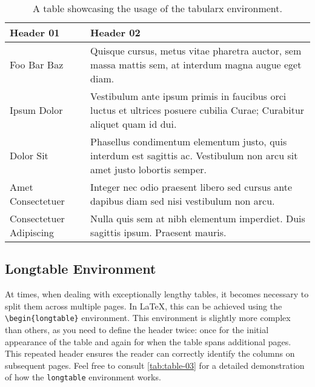 {	\begin{table}[!htpb]
		\caption{A table showcasing the usage of the tabularx environment.}
		\label{tab:table-02}
		\begin{tabularx}{\textwidth}{lX}
			\toprule
			\textbf{Header 01}      & \textbf{Header 02}                                                                                                        \\
			\midrule
			Foo Bar Baz             & Quisque cursus, metus vitae pharetra auctor, sem massa mattis sem, at interdum magna augue eget diam.                     \\
			Ipsum Dolor             & Vestibulum ante ipsum primis in faucibus orci luctus et ultrices posuere cubilia Curae; Curabitur aliquet quam id dui.    \\
			Dolor Sit               & Phasellus condimentum elementum justo, quis interdum est sagittis ac. Vestibulum non arcu sit amet justo lobortis semper. \\
			Amet Consectetuer       & Integer nec odio praesent libero sed cursus ante dapibus diam sed nisi vestibulum non arcu.                               \\
			Consectetuer Adipiscing & Nulla quis sem at nibh elementum imperdiet. Duis sagittis ipsum. Praesent mauris.                                         \\
			\bottomrule
		\end{tabularx}
	\end{table}

	\subsection{Longtable Environment}
	At times, when dealing with exceptionally lengthy tables, it becomes necessary to split them across multiple pages. In \LaTeX, this can be achieved using the \verb|\begin{longtable}| environment. This environment is slightly more complex than others, as you need to define the header twice: once for the initial appearance of the table and again for when the table spans additional pages. This repeated header ensures the reader can correctly identify the columns on subsequent pages. Feel free to consult \autoref{tab:table-03} for a detailed demonstration of how the \verb|longtable| environment works.

}
